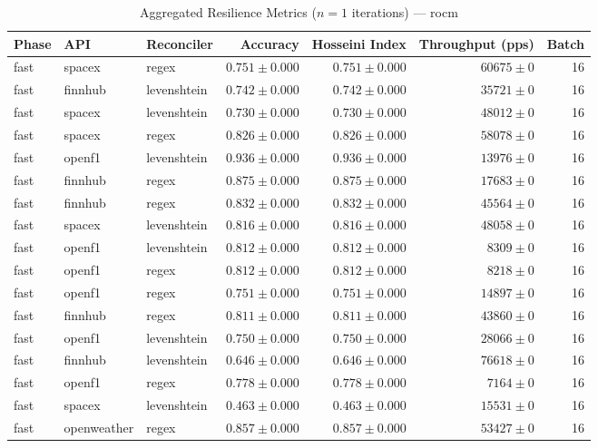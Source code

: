 
\begin{table}[htbp]
\caption{Aggregated Resilience Metrics ($n=1$ iterations) --- rocm}
\begin{tabular}{l l l r r r r}
\hline
Phase & API & Reconciler & Accuracy & Hosseini Index & Throughput (pps) & Batch \\
\hline
fast & spacex & regex & $0.751\pm0.000$ & $0.751\pm0.000$ & $60675\pm0$ & 16 \\
fast & finnhub & levenshtein & $0.742\pm0.000$ & $0.742\pm0.000$ & $35721\pm0$ & 16 \\
fast & spacex & levenshtein & $0.730\pm0.000$ & $0.730\pm0.000$ & $48012\pm0$ & 16 \\
fast & spacex & regex & $0.826\pm0.000$ & $0.826\pm0.000$ & $58078\pm0$ & 16 \\
fast & openf1 & levenshtein & $0.936\pm0.000$ & $0.936\pm0.000$ & $13976\pm0$ & 16 \\
fast & finnhub & regex & $0.875\pm0.000$ & $0.875\pm0.000$ & $17683\pm0$ & 16 \\
fast & finnhub & regex & $0.832\pm0.000$ & $0.832\pm0.000$ & $45564\pm0$ & 16 \\
fast & spacex & levenshtein & $0.816\pm0.000$ & $0.816\pm0.000$ & $48058\pm0$ & 16 \\
fast & openf1 & levenshtein & $0.812\pm0.000$ & $0.812\pm0.000$ & $8309\pm0$ & 16 \\
fast & openf1 & regex & $0.812\pm0.000$ & $0.812\pm0.000$ & $8218\pm0$ & 16 \\
fast & openf1 & regex & $0.751\pm0.000$ & $0.751\pm0.000$ & $14897\pm0$ & 16 \\
fast & finnhub & regex & $0.811\pm0.000$ & $0.811\pm0.000$ & $43860\pm0$ & 16 \\
fast & openf1 & levenshtein & $0.750\pm0.000$ & $0.750\pm0.000$ & $28066\pm0$ & 16 \\
fast & finnhub & levenshtein & $0.646\pm0.000$ & $0.646\pm0.000$ & $76618\pm0$ & 16 \\
fast & openf1 & regex & $0.778\pm0.000$ & $0.778\pm0.000$ & $7164\pm0$ & 16 \\
fast & spacex & levenshtein & $0.463\pm0.000$ & $0.463\pm0.000$ & $15531\pm0$ & 16 \\
fast & openweather & regex & $0.857\pm0.000$ & $0.857\pm0.000$ & $53427\pm0$ & 16 \\

\end{tabular}
\end{table}
